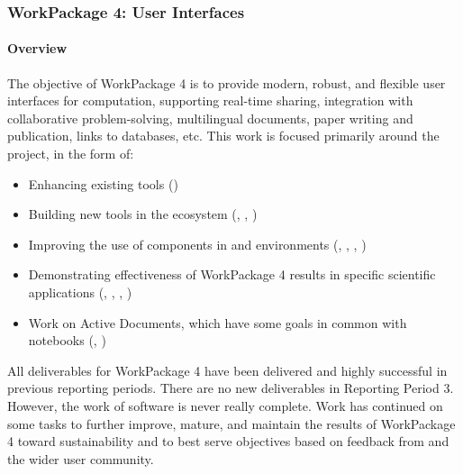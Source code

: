 \subsubsection{WorkPackage 4: User Interfaces}

\paragraph{Overview}

The objective of WorkPackage 4 is to provide modern, robust, and flexible user interfaces for
computation, supporting real-time sharing, integration with collaborative problem-solving,
multilingual documents, paper writing and publication, links to databases, etc. This work is focused primarily around the \Jupyter project, in the form of:

\begin{itemize}
    \item Enhancing existing \Jupyter tools ()
    \item Building new tools in the \Jupyter ecosystem (, , )
    \item Improving the use of \ODK components in \Jupyter and \Sage environments (, , , )
    \item Demonstrating effectiveness of WorkPackage 4 results in specific scientific applications (, , , )
    \item Work on Active Documents, which have some goals in common with \Jupyter notebooks (, )
\end{itemize}

All deliverables for WorkPackage 4 have been delivered and highly successful in previous reporting periods.
There are no new deliverables in Reporting Period 3.
However, the work of software is never really complete.
Work has continued on some tasks to further improve,
mature, and maintain the results of WorkPackage 4
toward sustainability and to best serve \ODK objectives
based on feedback from \ODK and the wider user community.

